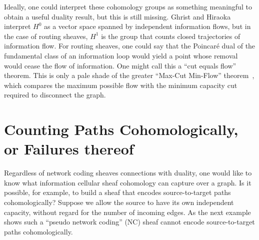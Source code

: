 Ideally, one could interpret these cohomology groups as something meaningful to obtain a useful duality result, but this is still missing. Ghrist and Hiraoka interpret $H^0$ as a vector space spanned by independent information flows, but in the case of routing sheaves, $H^1$ is the group that counts closed trajectories of information flow. For routing sheaves, one could say that the Poincar\'e dual of the fundamental class of an information loop would yield a point whose removal would cease the flow of information. One might call this a ``cut equals flow'' theorem. This is only a pale shade of the greater ``Max-Cut Min-Flow'' theorem~\cite{efs-mfmc, ff-mfmc, seymour-matroids}, which compares the maximum possible flow with the minimum capacity cut required to disconnect the graph.

\section{Counting Paths Cohomologically, or Failures thereof}

Regardless of network coding sheaves connections with duality, one would like to know what information cellular sheaf cohomology can capture over a graph. Is it possible, for example, to build a sheaf that encodes source-to-target paths cohomologically? Suppose we allow the source to have its own independent capacity, without regard for the number of incoming edges. As the next example shows such a ``pseudo network coding'' (NC) sheaf cannot encode source-to-target paths cohomologically.

